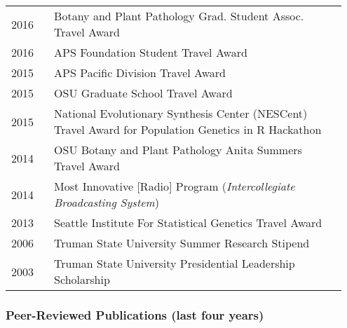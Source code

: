 \documentclass[12pt,letterpaper]{article}
\begin{document}
\begin{tabular}{p{0.125\linewidth}p{0.825\linewidth}}

2016 & Botany and Plant Pathology Grad. Student Assoc. Travel Award\\
2016 & APS Foundation Student Travel Award\\
2015 & APS Pacific Division Travel Award\\
2015 & OSU Graduate School Travel Award\\
2015 & National Evolutionary Synthesis Center (NESCent) Travel Award for Population Genetics in R Hackathon\\
2014 & OSU Botany and Plant Pathology Anita Summers Travel Award\\
2014 & Most Innovative [Radio] Program (\textit{Intercollegiate Broadcasting System})\\
2013 & Seattle Institute For Statistical Genetics Travel Award\\
2006 & Truman State University Summer Research Stipend\\
2003 & Truman State University Presidential Leadership Scholarship

\end{tabular}

\newpage

\subsubsection*{Peer-Reviewed Publications (last four years)}
\end{document}
